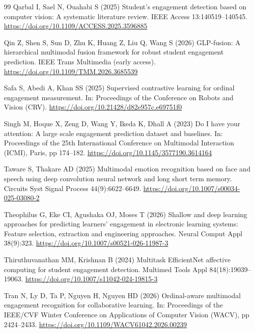 \documentclass[pdflatex,iicol,sn-basic]{sn-jnl}
\begin{document}
\begin{thebibliography}{99}
Qarbal I, Sael N, Ouahabi S (2025) Student's engagement detection based on computer vision: A systematic literature review. IEEE Access 13:140519--140545. \url{https://doi.org/10.1109/ACCESS.2025.3596885}

Qin Z, Shen S, Sun D, Zhu K, Huang Z, Liu Q, Wang S (2026) GLP-fusion: A hierarchical multimodal fusion framework for robust student engagement prediction. IEEE Trans Multimedia (early access). \url{https://doi.org/10.1109/TMM.2026.3685539}

Safa S, Abedi A, Khan SS (2025) Supervised contrastive learning for ordinal engagement measurement. In: Proceedings of the Conference on Robots and Vision (CRV). \url{https://doi.org/10.21428/d82e957c.e69751f0}

Singh M, Hoque X, Zeng D, Wang Y, Ikeda K, Dhall A (2023) Do I have your attention: A large scale engagement prediction dataset and baselines. In: Proceedings of the 25th International Conference on Multimodal Interaction (ICMI), Paris, pp 174--182. \url{https://doi.org/10.1145/3577190.3614164}

Taware S, Thakare AD (2025) Multimodal emotion recognition based on face and speech using deep convolution neural network and long short term memory. Circuits Syst Signal Process 44(9):6622--6649. \url{https://doi.org/10.1007/s00034-025-03080-2}

Theophilus G, Eke CI, Agushaka OJ, Moses T (2026) Shallow and deep learning approaches for predicting learners' engagement in electronic learning systems: Feature selection, extraction and engineering approaches. Neural Comput Appl 38(9):323. \url{https://doi.org/10.1007/s00521-026-11987-3}

Thiruthuvanathan MM, Krishnan B (2024) Multitask EfficientNet affective computing for student engagement detection. Multimed Tools Appl 84(18):19039--19063. \url{https://doi.org/10.1007/s11042-024-19815-3}

Tran N, Ly D, Ta P, Nguyen H, Nguyen HD (2026) Ordinal-aware multimodal engagement recognition for collaborative learning. In: Proceedings of the IEEE/CVF Winter Conference on Applications of Computer Vision (WACV), pp 2424--2433. \url{https://doi.org/10.1109/WACV61042.2026.00239}


\end{thebibliography}
\end{document}
